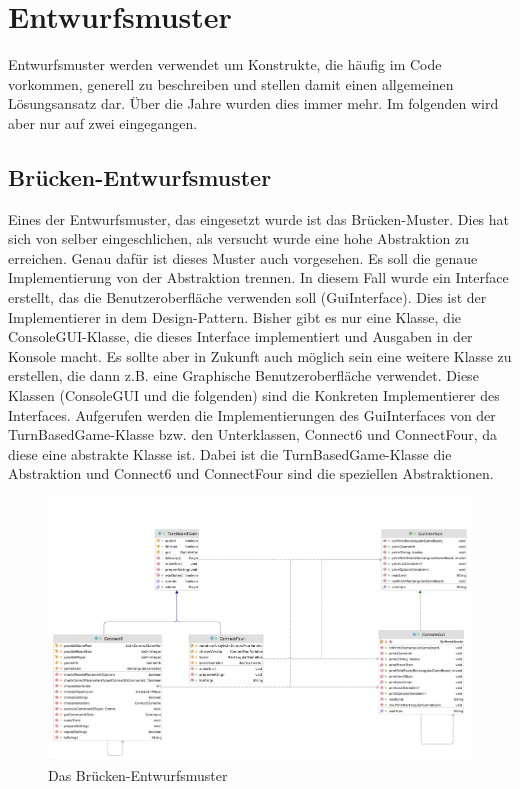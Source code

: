 \documentclass[12pt]{article}
\begin{document}
\newpage
\section{Entwurfsmuster}
Entwurfsmuster werden verwendet um Konstrukte, die häufig im Code vorkommen, generell zu beschreiben und stellen damit einen allgemeinen Lösungsansatz dar. Über die Jahre wurden dies immer mehr. Im folgenden wird aber nur auf zwei eingegangen.



\subsection{Brücken-Entwurfsmuster}
Eines der Entwurfsmuster, das eingesetzt wurde ist das Brücken-Muster. Dies hat sich von selber eingeschlichen, als versucht wurde eine hohe Abstraktion zu erreichen. Genau dafür ist dieses Muster auch vorgesehen. Es soll die genaue Implementierung von der Abstraktion trennen. In diesem Fall wurde ein Interface erstellt, das die Benutzeroberfläche verwenden soll (GuiInterface). Dies ist der Implementierer in dem Design-Pattern. Bisher gibt es nur eine Klasse, die ConsoleGUI-Klasse, die dieses Interface implementiert und Ausgaben in der Konsole macht. Es sollte aber in Zukunft auch möglich sein eine weitere Klasse zu erstellen, die dann z.B. eine Graphische Benutzeroberfläche verwendet. Diese Klassen (ConsoleGUI und die folgenden) sind die Konkreten Implementierer des Interfaces. Aufgerufen werden die Implementierungen des GuiInterfaces von der TurnBasedGame-Klasse bzw. den Unterklassen, Connect6 und ConnectFour, da diese eine abstrakte Klasse ist. Dabei ist die TurnBasedGame-Klasse die Abstraktion und Connect6 und ConnectFour sind die speziellen Abstraktionen.

\begin{figure}[htpb!]
\centering
\includegraphics[width=13cm]{Bilder/Bridge_complete}
\caption{Das Brücken-Entwurfsmuster}
\label{fig:bridge}
\end{figure}
\end{document}
